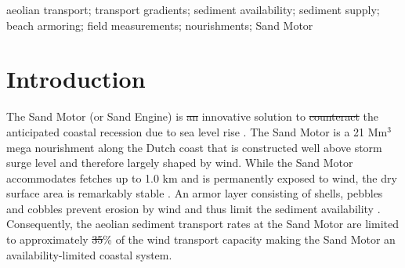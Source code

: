 \documentclass[preprint,12pt,authoryear,a4paper]{elsarticle}
\providecommand{\DIFadd}[1]{{\protect\color{blue}\uwave{#1}}} %
\providecommand{\DIFdel}[1]{{\protect\color{red}\sout{#1}}}                      %
\providecommand{\DIFaddbegin}{} %
\providecommand{\DIFaddend}{} %
\providecommand{\DIFdelbegin}{} %
\providecommand{\DIFdelend}{} %
\begin{document}
\begin{frontmatter}
\begin{abstract}
  \DIFaddend \end{abstract}

  \begin{keyword}
    aeolian transport; transport gradients; sediment availability;
    sediment supply; beach armoring; field measurements; nourishments;
    Sand Motor
  \end{keyword}

\end{frontmatter}

\section{Introduction}

The Sand Motor (or Sand Engine) is \DIFdelbegin \DIFdel{an }\DIFdelend \DIFaddbegin \DIFadd{a }\DIFaddend innovative solution to \DIFdelbegin \DIFdel{counteract }\DIFdelend \DIFaddbegin \DIFadd{counter
act }\DIFaddend the anticipated coastal recession due to sea level rise
\citep{Stive2013}. The Sand Motor is a 21 $\mathrm{Mm^3}$ mega
nourishment along the Dutch coast that is constructed well above storm
surge level and therefore largely shaped by wind. While the Sand Motor
accommodates fetches up to 1.0 km and is permanently exposed to wind,
the dry surface area is remarkably stable \citep{Hoonhout2017a}. An
armor layer consisting of shells, pebbles and cobbles prevent erosion
by wind and thus limit the sediment availability \citep[following the
definition of][]{Kocurek1999}. Consequently, the aeolian sediment
transport rates at the Sand Motor are limited to approximately \DIFdelbegin \DIFdel{35}\DIFdelend \DIFaddbegin \DIFadd{25}\DIFaddend \% of
the wind transport capacity \citep{Hoonhout2017a} making the Sand
Motor an availability-limited coastal system.
\end{document}
